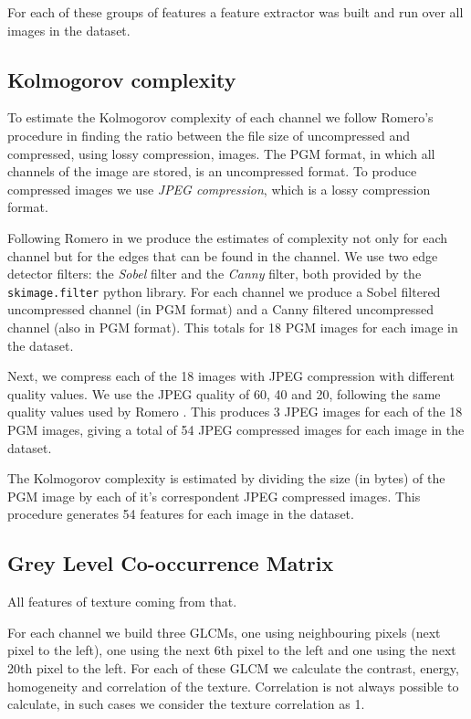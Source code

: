 \documentclass[11pt,a4paper,draft]{report}
\begin{document}
\begin{multicols}{2}
For each of these groups of features a feature extractor was built and run over
all images in the dataset.

\subsection{Kolmogorov complexity}

To estimate the Kolmogorov complexity of each channel we follow Romero's
procedure \cite{jma12clas} in finding the ratio between the file size of
uncompressed and compressed, using lossy compression, images.  The PGM format,
in which all channels of the image are stored, is an uncompressed format.  To
produce compressed images we use \emph{JPEG compression}, which is a lossy
compression format.

Following Romero in \cite{jma12clas} we produce the estimates of complexity not
only for each channel but for the edges that can be found in the channel.  We
use two edge detector filters: the \emph{Sobel} filter and the \emph{Canny}
filter, both provided by the \texttt{skimage.filter} python library.  For each
channel we produce a Sobel filtered uncompressed channel (in PGM format) and a
Canny filtered uncompressed channel (also in PGM format).  This totals for 18
PGM images for each image in the dataset.

Next, we compress each of the 18 images with JPEG compression with different
quality values.  We use the JPEG quality of 60, 40 and 20, following the same
quality values used by Romero \cite{jma12clas}.  This produces 3 JPEG images
for each of the 18 PGM images, giving a total of 54 JPEG compressed images for
each image in the dataset.

The Kolmogorov complexity is estimated by dividing the size (in bytes) of the
PGM image by each of it's correspondent JPEG compressed images.  This procedure
generates 54 features for each image in the dataset.


\subsection{Grey Level Co-occurrence Matrix}

All features of texture coming from that.

For each channel we build three GLCMs, one using neighbouring pixels (next
pixel to the left), one using the next 6th pixel to the left and one using the
next 20th pixel to the left.  For each of these GLCM we calculate the contrast,
energy, homogeneity and correlation of the texture.  Correlation is not always
possible to calculate, in such cases we consider the texture correlation as 1.


\end{multicols}
\end{document}
